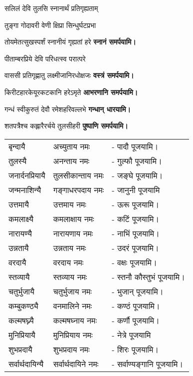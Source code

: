 \begin{center}
{सलिलं देवि तुलसि स्नानार्थं प्रतिगृह्यताम्}

{तुङ्गा गोदावरी वेणी क्षिप्रा सिन्धुर्घटप्रभा}

{तोयमेतत्सुखस्पर्शं स्नानीयं गृह्यतां हरे}
\textbf{\devAya{} स्नानं समर्पयामि।}
\medskip

{पीताम्बरप्रिये देवि परिधत्स्व परात्परे}

{वाससी प्रतिगृह्णातु लक्ष्मीजानिरधोक्षजः}
\textbf{\devAya{} वस्त्रं समर्पयामि।}
\medskip

{किरीटहारकेयूरकटकानि हरेऽमृते}
\textbf{\devAya{} आभरणानि समर्पयामि।}
\medskip

{गन्धं स्वीकुरुतं देवौ रमेशहरिवल्लभे}
\textbf{\devAya{} गन्धान् धारयामि।}
\medskip

{शतपत्रैश्च कह्लारैरर्चये तुलसीहरी}
\textbf{\devAya{} पुष्पाणि समर्पयामि।}
\medskip



\begin{tabular}{ll@{}l}
बृन्दायै &  अच्युताय नमः & - पादौ पूजयामि।\\
तुलस्यै & अनन्ताय   नमः  &- गुल्फौ पूजयामि।\\
जनार्दनप्रियायै &  तुलसीकान्ताय नमः & - जङ्घे पूजयामि।\\
जन्मनाशिन्यै &  गङ्गाधरपदाय नमः & - जानुनी पूजयामि \\
उत्तमायै &  उत्तमाय नमः & - ऊरू पूजयामि।\\
कमलाक्ष्यै &  कमलाक्षाय नमः & - कटिं पूजयामि।\\
नारायण्यै &  नारायणाय नमः & - नाभिं पूजयामि।\\
उन्नतायै &  उन्नताय नमः & - उदरं पूजयामि।\\
वरदायै &  वरदाय नमः & - वक्षः पूजयामि।\\
स्तव्यायै &  स्तव्याय नमः & - स्तनौ कौस्तुभं पूजयामि।\\
चतुर्भुजायै &  चतुर्भुजाय नमः & - भुजान् पूजयामि।\\
कम्बुकण्ठ्यै &  वनमालिने नमः & - कण्ठं पूजयामि।\\
कल्मषघ्न्यै &  कल्मषघ्नाय नमः & - कर्णौ पूजयामि।\\
मुनिप्रियायै &  मुनिप्रियाय नमः & - नेत्रे पूजयामि\\
शुभप्रदायै &  शुभप्रदाय नमः & - शिरः पूजयामि।\\
सर्वार्थदायिन्यै &  सर्वार्थदायिने नमः & - सर्वाण्यङ्गानि पूजयामि। \\
\end{tabular}



\end{center}
